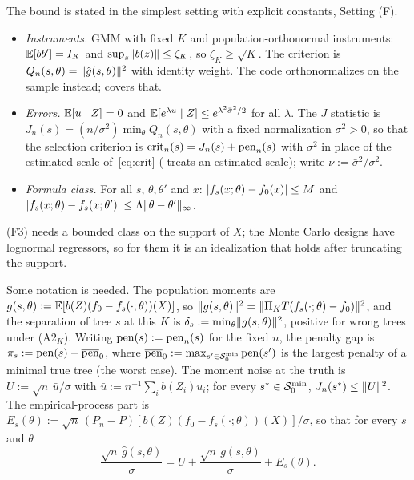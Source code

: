 The bound is stated in the simplest setting with explicit constants, Setting (F).
\begin{itemize}
\item[(F1)] \emph{Instruments.} GMM with fixed $K$ and population-orthonormal instruments: $\mathbb{E}[bb'] = I_K$ and $\sup_z\lVert b(z)\rVert \le \zeta_K$, so $\zeta_K \ge \sqrt K$. The criterion is $Q_n(s,\theta) = \lVert \hat g(s,\theta)\rVert^2$ with identity weight. The code orthonormalizes on the sample instead;  covers that.
\item[(F2)] \emph{Errors.} $\mathbb{E}[u \mid Z] = 0$ and $\mathbb{E}[e^{\lambda u} \mid Z] \le e^{\lambda^2\bar\sigma^2/2}$ for all $\lambda$. The $J$ statistic is $J_n(s) = (n/\sigma^2)\min_\theta Q_n(s,\theta)$ with a fixed normalization $\sigma^2 > 0$, so that the selection criterion is $\mathrm{crit}_n(s) = J_n(s) + \mathrm{pen}_n(s)$ with $\sigma^2$ in place of the estimated scale of~\eqref{eq:crit} ( treats an estimated scale); write $\nu := \bar\sigma^2/\sigma^2$.
\item[(F3)] \emph{Formula class.} For all $s$, $\theta, \theta'$ and $x$: $\lvert f_s(x;\theta) - f_0(x)\rvert \le M$ and $\lvert f_s(x;\theta) - f_s(x;\theta')\rvert \le \Lambda\lVert \theta - \theta'\rVert_\infty$.
\end{itemize}
(F3) needs a bounded class on the support of $X$; the Monte Carlo designs have lognormal regressors, so for them it is an idealization that holds after truncating the support.

Some notation is needed. The population moments are $g(s,\theta) := \mathbb{E}[b(Z)(f_0 - f_s(\cdot;\theta))(X)]$, so $\lVert g(s,\theta)\rVert^2 = \lVert \Pi_KT(f_s(\cdot;\theta) - f_0)\rVert^2$, and the separation of tree $s$ at this $K$ is $\delta_s := \min_\theta\lVert g(s,\theta)\rVert^2$, positive for wrong trees under (A2$_K$). Writing $\mathrm{pen}(s) := \mathrm{pen}_n(s)$ for the fixed $n$, the penalty gap is $\pi_s := \mathrm{pen}(s) - \overline{\mathrm{pen}}_0$, where $\overline{\mathrm{pen}}_0 := \max_{s' \in \mathcal{S}_0^{\min}}\mathrm{pen}(s')$ is the largest penalty of a minimal true tree (the worst case). The moment noise at the truth is $U := \sqrt n\,\bar u/\sigma$ with $\bar u := n^{-1}\sum_ib(Z_i)u_i$; for every $s^* \in \mathcal{S}_0^{\min}$, $J_n(s^*) \le \lVert U\rVert^2$. The empirical-process part is $E_s(\theta) := \sqrt n\,(P_n - P)[b(Z)(f_0 - f_s(\cdot;\theta))(X)]/\sigma$, so that for every $s$ and $\theta$
\begin{equation}
\frac{\sqrt n\,\hat g(s,\theta)}{\sigma} = U + \frac{\sqrt n\,g(s,\theta)}{\sigma} + E_s(\theta).
\label{eq:decomp}
\end{equation}


